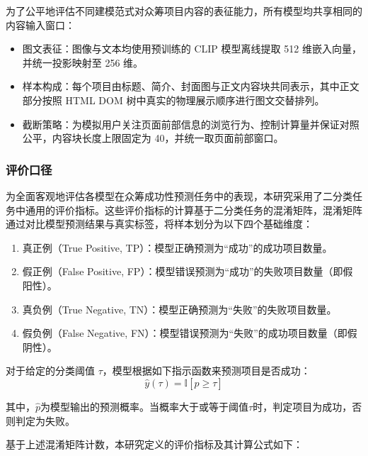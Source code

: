为了公平地评估不同建模范式对众筹项目内容的表征能力，所有模型均共享相同的内容输入窗口：

\begin{itemize}
\item
  图文表征：图像与文本均使用预训练的 CLIP 模型离线提取 512 维嵌入向量，并统一投影映射至 256 维。
\item
  样本构成：每个项目由标题、简介、封面图与正文内容块共同表示，其中正文部分按照 HTML DOM 树中真实的物理展示顺序进行图文交替排列。
\item
  截断策略：为模拟用户关注页面前部信息的浏览行为、控制计算量并保证对照公平，内容块长度上限固定为 40，并统一取页面前部窗口。
\end{itemize}

\subsubsection{评价口径}

为全面客观地评估各模型在众筹成功性预测任务中的表现，本研究采用了二分类任务中通用的评价指标。这些评价指标的计算基于二分类任务的混淆矩阵，混淆矩阵通过对比模型预测结果与真实标签，将样本划分为以下四个基础维度：

\begin{enumerate}
\def\labelenumi{(\arabic{enumi})}
\item
  真正例（True Positive, TP）：模型正确预测为``成功''的成功项目数量。
\item
  假正例（False Positive, FP）：模型错误预测为``成功''的失败项目数量（即假阳性）。
\item
  真负例（True Negative, TN）：模型正确预测为``失败''的失败项目数量。
\item
  假负例（False Negative, FN）：模型错误预测为``失败''的成功项目数量（即假阴性）。
\end{enumerate}

对于给定的分类阈值 $ \tau $，模型根据如下指示函数来预测项目是否成功：
\begin{equation}
\hat{y}(\tau)=\mathbb{I}[\hat{p}\ge\tau]
\end{equation}

其中，$ \hat{p} $为模型输出的预测概率。当概率大于或等于阈值$ \tau $时，判定项目为成功，否则判定为失败。

基于上述混淆矩阵计数，本研究定义的评价指标及其计算公式如下：

